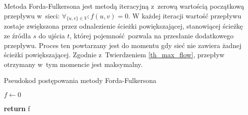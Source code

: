 \par{
  Metoda Forda-Fulkersona jest metodą iteracyjną z~zerową wartością początkową przepływu w~sieci: $\forall_{\{u,v\}\in V}: f(u,v)=0$.
  W każdej iteracji wartość przepływu zostaje zwiększona przez odnalezienie ścieżki powiększającej, stanowiącej ścieżkę ze źródła $s$ do ujścia $t$, której pojemność pozwala na przesłanie dodatkowego przepływu.
  Proces ten powtarzany jest do momentu gdy sieć nie zawiera żadnej ścieżki powiększającej.
  Zgodnie z~Twierdzeniem \ref{th_max_flow}, przepływ otrzymany w~tym momencie jest maksymalny.
  \begin{algorithm}
    \caption{Pseudokod postępowania metody Forda-Fulkersona}\label{alg_fordFulkerson}
    \begin{algorithmic}[1]



        \State $f \gets 0$

        \EndWhile
        \State\textbf{return} f
      \EndFunction
  \end{algorithmic}
  \end{algorithm}
}
